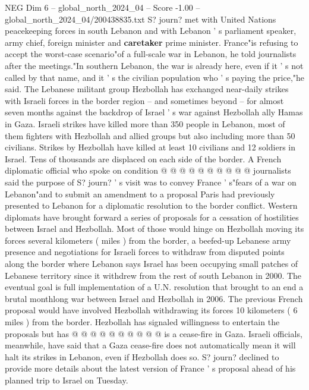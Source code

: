\begin{textsample}{NEG Dim 6 – global\_north\_2024\_04 – Score -1.00 – global\_north\_2024\_04/200438835.txt}  \label{ex:f6_neg_369}
S? journ? met with United Nations peacekeeping forces in south Lebanon and with Lebanon ' s parliament speaker, army chief, foreign minister and \textbf{caretaker} prime minister.
France"is refusing to accept the worst-case scenario"of a full-scale war in Lebanon, he told journalists after the meetings."In southern Lebanon, the war is already here, even if it ' s not called by that name, and it ' s the civilian population who ' s paying the price,"he said.
The Lebanese militant group Hezbollah has exchanged near-daily strikes with Israeli forces in the border region -- and sometimes beyond -- for almost seven months against the backdrop of Israel ' s war against Hezbollah ally Hamas in Gaza.
Israeli strikes have killed more than 350 people in Lebanon, most of them fighters with Hezbollah and allied groups but also including more than 50 civilians.
Strikes by Hezbollah have killed at least 10 civilians and 12 soldiers in Israel.
Tens of thousands are displaced on each side of the border.
A French diplomatic official who spoke on condition @ @ @ @ @ @ @ @ @ @ journalists said the purpose of S? journ? ' s visit was to convey France ' s"fears of a war on Lebanon"and to submit an amendment to a proposal Paris had previously presented to Lebanon for a diplomatic resolution to the border conflict.
Western diplomats have brought forward a series of proposals for a cessation of hostilities between Israel and Hezbollah.
Most of those would hinge on Hezbollah moving its forces several kilometers ( miles ) from the border, a beefed-up Lebanese army presence and negotiations for Israeli forces to withdraw from disputed points along the border where Lebanon says Israel has been occupying small patches of Lebanese territory since it withdrew from the rest of south Lebanon in 2000.
The eventual goal is full implementation of a U.N. resolution that brought to an end a brutal monthlong war between Israel and Hezbollah in 2006.
The previous French proposal would have involved Hezbollah withdrawing its forces 10 kilometers ( 6 miles ) from the border.
Hezbollah has signaled willingness to entertain the proposals but has @ @ @ @ @ @ @ @ @ @ is a cease-fire in Gaza.
Israeli officials, meanwhile, have said that a Gaza cease-fire does not automatically mean it will halt its strikes in Lebanon, even if Hezbollah does so.
S? journ? declined to provide more details about the latest version of France ' s proposal ahead of his planned trip to Israel on Tuesday.

\end{textsample}
